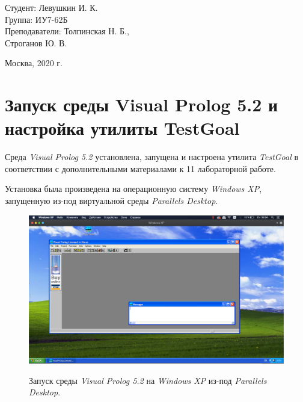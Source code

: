 \documentclass[a4paper,12pt]{article}
\begin{document}
	\vspace*{15mm} 	
	
	\large
	\begin{flushright}
		Студент: Левушкин И. К. \\
		Группа: ИУ7-62Б \\
		Преподаватели: Толпинская Н. Б., \\ Строганов Ю. В. \\
	\end{flushright}
	
	\vspace*{30mm}
	\begin{center}
		Москва, 2020 г.  
	\end{center}
	\thispagestyle{empty}
	
	
	\newpage
	
	\section{Запуск среды Visual Prolog 5.2 и настройка утилиты TestGoal}
	
	Среда \textit{Visual Prolog 5.2} установлена, запущена и настроена утилита \textit{TestGoal} в соответствии с дополнительными материалами к 11 лабораторной работе.
	
	Установка была произведена на операционную систему \textit{Windows XP}, запущенную из-под виртуальной среды \textit{Parallels Desktop}.
	
	\begin{figure}[h!]
		\begin{center}
			{\includegraphics[scale = 0.3]{parallels.png}}
			\label{parallels}
		\end{center}
	\caption{Запуск среды \textit{Visual Prolog 5.2} на \textit{Windows XP} из-под \textit{Parallels Desktop}.}
	\end{figure}
	
\end{document}
